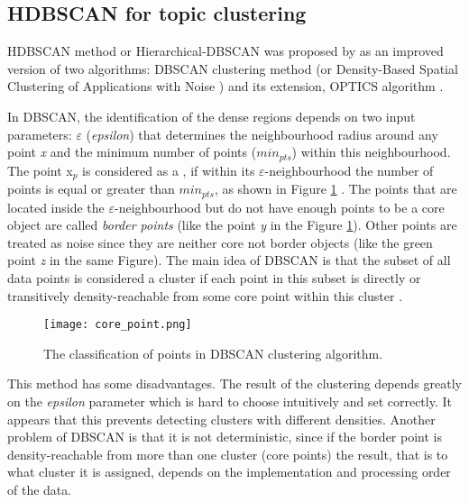 \documentclass[fontsize=12pt,a4paper,twoside,openany]{scrbook}
\begin{document}
\subsection{HDBSCAN for topic clustering}
\label{sec:HDBSCAN}

HDBSCAN method or Hierarchical-DBSCAN was proposed by \parencite{Campello13, Campello15} as an improved version of two algorithms: DBSCAN clustering method (or Density-Based Spatial Clustering of Applications with Noise \parencite{Ester96}) and its extension, OPTICS algorithm \parencite{Ankerst99}.

In DBSCAN, the identification of the dense regions depends on two input parameters:  \(\varepsilon\) (\emph{epsilon}) that determines the neighbourhood radius around any point \emph{x} and the minimum number of points (\(min_{pts}\)) within this neighbourhood. The point x\(_p\) is considered as a  \parencite{Campello13}, if within its \(\varepsilon\)-neighbourhood the number of points is equal or greater than \(min_{pts}\), as shown in Figure \ref{fig:core_point} . The points that are located inside the \(\varepsilon\)-neighbourhood but do not have enough points to be a core object are called \emph{border points} (like the point \emph{y} in the Figure \ref{fig:core_point}). Other points are treated as noise since they are neither core not border objects (like the green point \emph{z} in the same Figure). The main idea of DBSCAN is that the subset of all data points is considered a cluster if each point in this subset is directly or transitively density-reachable from some core point within this cluster \parencite{Ester96}.

\begin{figure}[h]
\centering
\texttt{[image: core\_point.png]}
\caption{The classification of points in DBSCAN clustering algorithm.}
\label{fig:core_point}
\end{figure}

This method has some disadvantages. The result of the clustering depends greatly on the \emph{epsilon} parameter which is hard to choose intuitively and set correctly. It appears that this  \parencite{Malzer20} prevents detecting clusters with different densities. Another problem of DBSCAN is that it is not deterministic, since if the border point is density-reachable from more than one cluster (core points) the result, that is to what cluster it is assigned, depends on the implementation and processing order of the data. 
\end{document}
